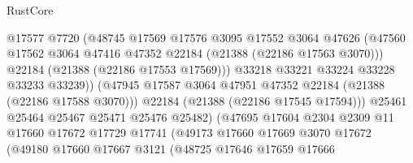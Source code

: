 \begin{lexlean}{RustCore}
\begin{coremodule}
                                    @17577
                                    @7720
                                    (@48745
                                      @17569
                                      @17576
                                      @3095
                                      @17552
                                      @3064
                                      @47626
                                      (@47560
                                        @17562
                                        @3064
                                        @47416
                                        @47352
                                        @22184
                                        (@21388 (@22186 @17563 @3070)))
                                      @22184
                                      (@21388 (@22186 @17553 @17569)))
                                    @33218
                                    @33221
                                    @33224
                                    @33228
                                    @33233
                                    @33239))
                                (@47945
                                  @17587
                                  @3064
                                  @47951
                                  @47352
                                  @22184
                                  (@21388 (@22186 @17588 @3070)))
                                @22184
                                (@21388 (@22186 @17545 @17594)))
                              @25461
                              @25464
                              @25467
                              @25471
                              @25476
                              @25482)
                            (@47695
                              @17604
                              @2304
                              @2309
                              @11
                              @17660
                              @17672
                              @17729
                              @17741
                              (@49173
                                @17660
                                @17669
                                @3070
                                @17672
                                (@49180
                                  @17660
                                  @17667
                                  @3121
                                  (@48725
                                    @17646
                                    @17659
                                    @17666

\end{coremodule}
\end{lexlean}
